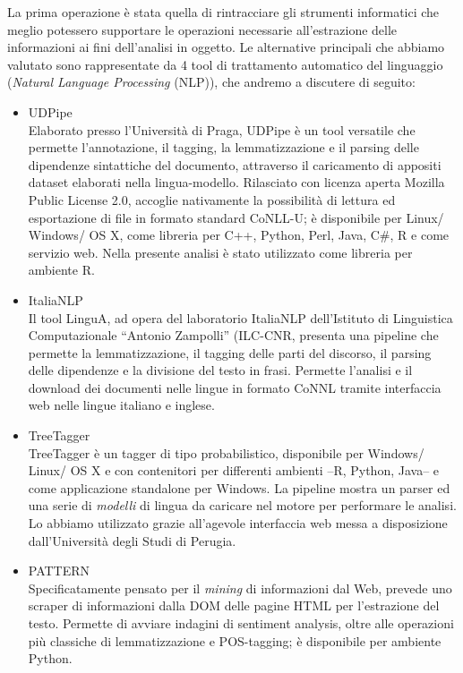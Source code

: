 La prima operazione è stata quella di rintracciare gli strumenti
informatici che meglio potessero supportare le operazioni necessarie
all'estrazione delle informazioni ai fini dell'analisi in oggetto. Le
alternative principali che abbiamo valutato sono rappresentate da 4 tool
di trattamento automatico del linguaggio (\emph{Natural Language
Processing} (NLP)), che andremo a discutere di seguito:

\begin{itemize}
\item
  UDPipe \autocite{udpipe2017}\\
  Elaborato presso l'Università di Praga, UDPipe è un tool versatile che
  permette l'annotazione, il tagging, la lemmatizzazione e il parsing
  delle dipendenze sintattiche del documento, attraverso il caricamento
  di appositi dataset elaborati nella lingua-modello. Rilasciato con
  licenza aperta Mozilla Public License 2.0, accoglie nativamente la
  possibilità di lettura ed esportazione di file in formato standard
  CoNLL-U; è disponibile per Linux/ Windows/ OS X, come libreria per
  C++, Python, Perl, Java, C\#, R e come servizio web. Nella presente
  analisi è stato utilizzato come libreria per ambiente R.
\item
  ItaliaNLP \autocite{attardi-et-al2009}\\
  Il tool LinguA, ad opera del laboratorio ItaliaNLP dell'Istituto di
  Linguistica Computazionale ``Antonio Zampolli'' (ILC-CNR, presenta una
  pipeline che permette la lemmatizzazione, il tagging delle parti del
  discorso, il parsing delle dipendenze e la divisione del testo in
  frasi. Permette l'analisi e il download dei documenti nelle lingue in
  formato CoNNL tramite interfaccia web nelle lingue italiano e inglese.
\item
  TreeTagger \autocite{schmid1994b}\\
  TreeTagger è un tagger di tipo probabilistico, disponibile per
  Windows/ Linux/ OS X e con contenitori per differenti ambienti --R,
  Python, Java-- e come applicazione standalone per Windows. La pipeline
  mostra un parser ed una serie di \emph{modelli} di lingua da caricare
  nel motore per performare le analisi. Lo abbiamo utilizzato grazie
  all'agevole interfaccia web messa a disposizione dall'Università degli
  Studi di Perugia.
\item
  PATTERN \autocite{pattern2012}\\
  Specificatamente pensato per il \emph{mining} di informazioni dal Web,
  prevede uno scraper di informazioni dalla DOM delle pagine HTML per
  l'estrazione del testo. Permette di avviare indagini di sentiment
  analysis, oltre alle operazioni più classiche di lemmatizzazione e
  POS-tagging; è disponibile per ambiente Python.
\end{itemize}

